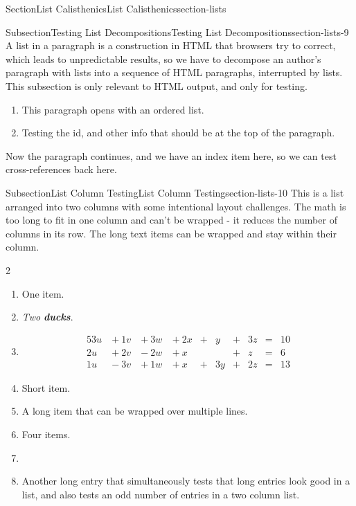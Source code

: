 \documentclass[twoside,10pt,]{article}
\newcommand{\alert}[1]{\textbf{\textit{#1}}}
\numberwithin{equation}{section}
\newcommand{\amp}{&}
\begin{document}
\begin{sectionptx}{Section}{List Calisthenics}{}{List Calisthenics}{}{}{section-lists}
\begin{subsectionptx}{Subsection}{Testing List Decompositions}{}{Testing List Decompositions}{}{}{section-lists-9}
A list in a paragraph is a construction in HTML that browsers try to correct, which leads to unpredictable results, so we have to decompose an author's paragraph with lists into a sequence of HTML paragraphs, interrupted by lists.  This subsection is only relevant to HTML output, and only for testing.%
\par
%
\begin{enumerate}
\item{}This paragraph opens with an ordered list.%
\item{}Testing the id, and other info that should be at the top of the paragraph.%
\end{enumerate}
Now the paragraph continues, and we have an index item here, so we can test cross-references back here.%
\end{subsectionptx}
%
%
\typeout{************************************************}
\typeout{************************************************}
%
\begin{subsectionptx}{Subsection}{List Column Testing}{}{List Column Testing}{}{}{section-lists-10}
This is a list arranged into two columns with some intentional layout challenges. The math is too long to fit in one column and can't be wrapped - it reduces the number of columns in its row. The long text items can be wrapped and stay within their column.%
\begin{multicols}{2}
\begin{enumerate}[label={(\alph*)}]
\item{}One item.%
\item{}\emph{Two} \alert{ducks}.%
\item{}%
\begin{alignat*}{5}
3u \amp {}+{} 1v \amp {}+{} 3w \amp {}+{} 2x \amp {}+{} \amp  y \amp {}+{} \amp 3z \amp {}={} \amp 10\\
2u \amp {}+{} 2v \amp {}-{} 2w \amp {}+{} x  \amp       \amp    \amp {}+{} \amp  z \amp {}={} \amp 6\\
1u \amp {}-{} 3v \amp {}+{} 1w \amp {}+{} x  \amp {}+{} \amp 3y \amp {}+{} \amp 2z \amp {}={} \amp 13
\end{alignat*}
%
\item{}Short item.%
\item{}A long item that can be wrapped over multiple lines.%
\item{}Four items.%
\item{}%
\item{}Another long entry that simultaneously tests that long entries look good in a list, and also tests an odd number of entries in a two column list.%

\end{enumerate}
\end{multicols}
\end{subsectionptx}
\end{sectionptx}
\end{document}

